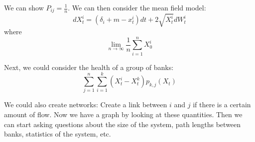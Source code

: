 We can show $P_{ij}=\frac{1}{n}$. We can then consider the mean field model:
\begin{equation}
	dX_t^i = \left( \delta_i + m - x_t^i \right) dt + 2 \sqrt{X_t^i }dW_t^i
\end{equation}
where
\begin{equation}
	\lim_{n\to \infty} \frac{1}{n} \sum_{i=1}^n X_0^i 
\end{equation}

Next, we could consider the health of a group of banks:
\begin{equation}
	\sum_{j=1}^n \sum_{i=1}^k \left( X_t^i - X_t^k \right)p_{k, j} (X_t)
\end{equation}

We could also create networks: Create a link between $i$ and $j$ if there is a certain amount of flow. Now we have a graph by looking at these quantities.
Then we can start asking questions about the size of the system, path lengths between banks, statistics of the system, etc.




























